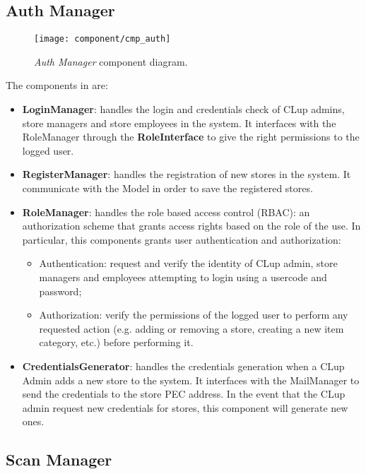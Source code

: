 \subsection{Auth Manager}

\begin{figure}[H]
	\centering
	\texttt{[image: component/cmp\_auth]}
	\caption{\textit{Auth Manager} component diagram.}
	\label{fig:cmp_auth}
\end{figure}

The components in  are:
\begin{itemize}
	\item \textbf{LoginManager}: handles the login and credentials check of CLup admins, store managers and store employees in the system. It interfaces with the RoleManager through the \textbf{RoleInterface} to give the right permissions to the logged user.
	
	\item \textbf{RegisterManager}: handles the registration of new stores in the system. It communicate with the Model in order to save the registered stores.
	
	\item \textbf{RoleManager}: handles the role based access control (RBAC): an authorization scheme that grants access rights based on the role of the use. In particular, this components grants user authentication and authorization:
	\begin{itemize}
		\item Authentication: request and verify the identity of CLup admin, store managers and employees attempting to login using a usercode and password;
		\item Authorization: verify the permissions of the logged user to perform any requested action (e.g. adding or removing a store, creating a new item category, etc.) before performing it.
	\end{itemize}
		
	\item \textbf{CredentialsGenerator}: handles the credentials generation when a CLup Admin adds a new store to the system. It interfaces with the MailManager to send the credentials to the store PEC address. In the event that the CLup admin request new credentials for stores, this component will generate new ones.
\end{itemize}


\subsection{Scan Manager}

